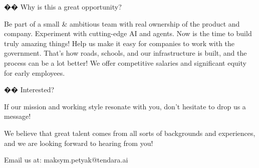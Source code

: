 �� Why is this a great opportunity?

Be part of a small & ambitious team with real ownership of the product and company.
Experiment with cutting-edge AI and agents. Now is the time to build truly amazing things!
Help us make it easy for companies to work with the government. That’s how roads, schools, and our infrastructure is built, and the process can be a lot better!
We offer competitive salaries and significant equity for early employees.


�� Interested?

If our mission and working style resonate with you, don’t hesitate to drop us a message!

We believe that great talent comes from all sorts of backgrounds and experiences, and we are looking forward to hearing from you!

Email us at: maksym.petyak@tendara.ai